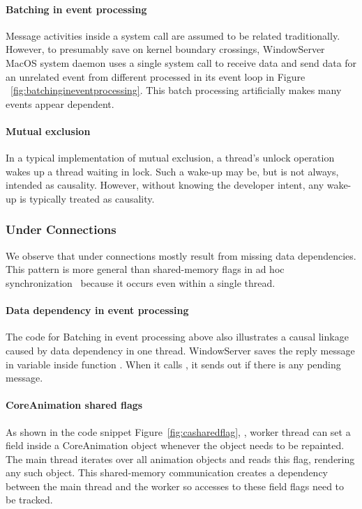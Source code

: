 \paragraph{Batching in event processing}

Message activities inside a system call are assumed to be related traditionally.
However, to presumably save on kernel boundary crossings, WindowServer MacOS
system daemon uses a single system call to receive data and send data for
an unrelated event from different processed in its event loop in Figure
~\ref{fig:batchingineventprocessing}. This batch processing artificially makes
many events appear dependent.

\paragraph{Mutual exclusion}

In a typical implementation of mutual exclusion, a thread's unlock operation
wakes up a thread waiting in lock. Such a wake-up may be, but is not always,
intended as causality. However, without knowing the developer intent, any
wake-up is typically treated as causality. %

\subsubsection{Under Connections}\label{subsec:underconnections}

We observe that under connections mostly result from missing data
dependencies.  This pattern is more general than shared-memory flags in ad
hoc synchronization~\cite{xiong2010ad} because it occurs even within a
single thread.

\paragraph{Data dependency in event processing}
The code for Batching in event processing above also illustrates a causal
linkage caused by data dependency in one thread. WindowServer saves the reply
message in variable  inside function .
When it calls , it sends out  if there is
any pending message.

\paragraph{CoreAnimation shared flags}
As shown in the code snippet Figure~\ref{fig:casharedflag}, , worker thread can set a
field  inside a CoreAnimation object whenever the object needs
to be repainted. The main thread iterates over all animation objects and reads
this flag, rendering any such object. This shared-memory communication creates
a dependency between the main thread and the worker so accesses to these field
flags need to be tracked.

